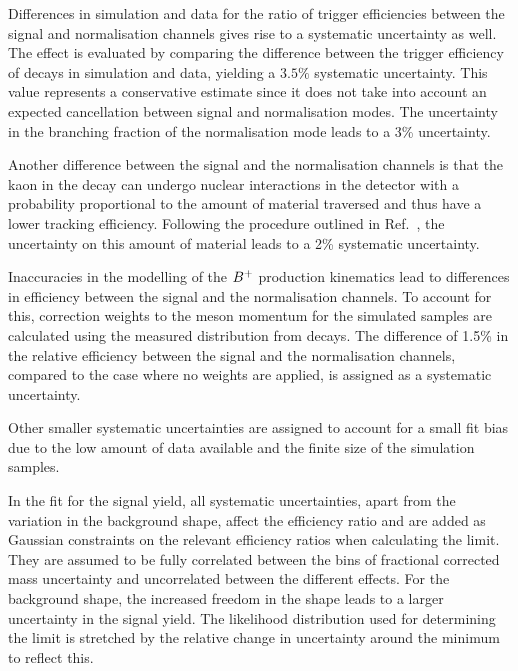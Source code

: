 Differences in simulation and data for the ratio of trigger efficiencies between the signal and normalisation channels gives rise to a systematic uncertainty as well. The effect is evaluated by comparing the difference between the trigger efficiency of \mbox{\decay{\Bp}{\jpsi\Kp}} decays in simulation and data, yielding a $3.5\%$ systematic uncertainty. This value represents a conservative estimate since it does not take into account an expected cancellation between signal and normalisation modes. The uncertainty in the branching fraction of the normalisation mode leads to a 3\% uncertainty.

Another difference between the signal and the normalisation channels is that
the kaon in the decay \decay{\Bp}{\jpsi\Kp} can undergo nuclear interactions in the detector
with a
probability proportional to the amount of material traversed and thus have a lower tracking efficiency. Following the
procedure outlined in Ref.~\cite{LHCb-DP-2013-002}, the uncertainty on this
amount of material leads to a 2\% systematic uncertainty.

Inaccuracies in the modelling of the ${{{B}^+}}$ production kinematics lead to differences in efficiency between the signal and the normalisation channels. To account for this, correction weights to the \Bp meson momentum for the simulated samples are calculated using the measured distribution from \decay{\Bp}{\jpsi\Kp} decays.  The difference of 1.5\% in the relative efficiency between the signal and the normalisation channels, compared to the case where no weights are applied, is assigned as a systematic uncertainty.

Other smaller systematic uncertainties are assigned to account for a small fit bias due to the low amount of data available and the finite size of the simulation samples.

In the fit for the signal yield, all systematic uncertainties, apart from the variation in the background shape, affect the efficiency ratio and are added
as Gaussian constraints on the relevant efficiency ratios when calculating
the limit. They are assumed to be fully correlated between the bins of
fractional corrected mass uncertainty and uncorrelated between the different
effects. For the background shape, the increased freedom in the shape leads
to a larger uncertainty in the signal yield. The likelihood distribution used for determining the limit is stretched by the relative change in uncertainty around the minimum to reflect this.
